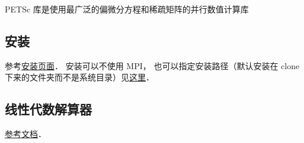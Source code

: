 
PETSc 库是使用最广泛的偏微分方程和稀疏矩阵的并行数值计算库

\subsection{安装}
参考\href{https://petsc.org/release/install/install_tutorial/}{安装页面}．
安装可以不使用 MPI， 也可以指定安装路径（默认安装在 clone 下来的文件夹而不是系统目录）见\href{https://petsc.org/release/install/install/#mpi-problems-i-don-t-want-mpi}{这里}．

\subsection{线性代数解算器}
\href{https://petsc.org/release/docs/manual/ksp/}{参考文档}．
